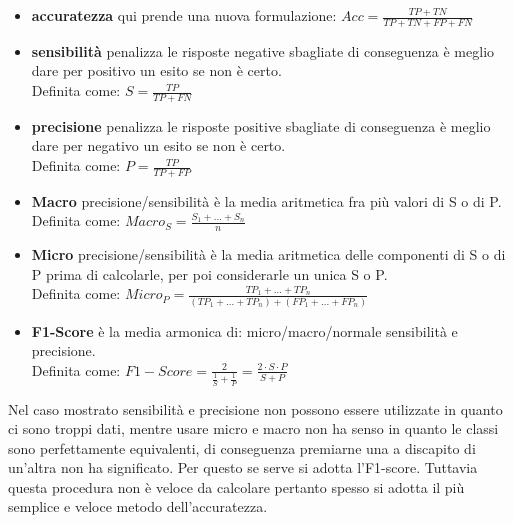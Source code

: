 \begin{itemize}
	\item \textbf{accuratezza} qui prende una nuova formulazione: $\displaystyle Acc = \frac{TP + TN}{TP + TN + FP + FN} $
	\item \textbf{sensibilità} penalizza le risposte negative sbagliate di conseguenza è meglio dare per positivo un esito se non è certo.\\
	Definita come: $\displaystyle S = \frac{TP}{TP + FN} $
	\item \textbf{precisione} penalizza le risposte positive sbagliate di conseguenza è meglio dare per negativo un esito se non è certo.\\
	Definita come: $\displaystyle P = \frac{TP}{TP + FP} $
	\item \textbf{Macro} precisione/sensibilità è la media aritmetica fra più valori di S o di P.\\
	Definita come: $\displaystyle Macro_{S} = \frac{S_1 + ... + S_n}{n} $
	\item \textbf{Micro} precisione/sensibilità è la media aritmetica delle componenti di S o di P prima di calcolarle, per poi considerarle un unica S o P.\\
	Definita come: $\displaystyle Micro_{P} = \frac{TP_1 + ... + TP_n }{ (TP_1 + ... + TP_n) + (FP_1 + ... + FP_n) } $
	\item \textbf{F1-Score} è la media armonica di: micro/macro/normale sensibilità e precisione.\\
	Definita come: $\displaystyle F1-Score = \frac{2}{ \frac{1}{S} + \frac{1}{P} } = \frac{2 \cdot S \cdot P}{ S + P }$
\end{itemize}
Nel caso mostrato sensibilità e precisione non possono essere utilizzate in quanto ci sono troppi dati, mentre usare micro e macro non ha senso in quanto le classi sono perfettamente equivalenti, di conseguenza premiarne una a discapito di un'altra non ha significato. Per questo se serve si adotta l'F1-score. Tuttavia questa procedura non è veloce da calcolare pertanto spesso si adotta il più semplice e veloce metodo dell'accuratezza.
%
